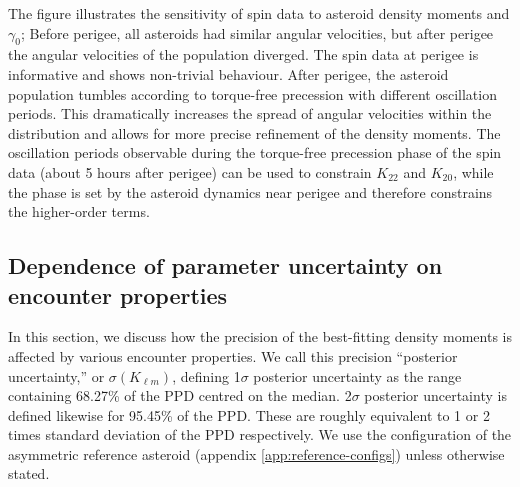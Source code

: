 \documentclass[fleqn,usenatbib]{mnras}
\begin{document}
The figure illustrates the sensitivity of spin data to asteroid density moments and $\gamma_0$; Before perigee, all asteroids had similar angular velocities, but after perigee the angular velocities of the population diverged. The spin data at perigee is informative and shows non-trivial behaviour. After perigee, the asteroid population tumbles according to torque-free precession with different oscillation periods. This dramatically increases the spread of angular velocities within the distribution and allows for more precise refinement of the density moments. The oscillation periods observable during the torque-free precession phase of the spin data (about 5 hours after perigee) can be used to constrain $K_{22}$ and $K_{20}$, while the phase is set by the asteroid dynamics near perigee and therefore constrains the higher-order terms.






\subsection{Dependence of parameter uncertainty on encounter properties}
\label{sec:fit-uncertainty}

In this section, we discuss how the precision of the best-fitting density moments is affected by various encounter properties. We call this precision ``posterior uncertainty,'' or $\sigma(K_{\ell m})$, defining 1$\sigma$  posterior uncertainty as the range containing 68.27\% of the PPD centred on the median. 2$\sigma$ posterior uncertainty is defined likewise for 95.45\% of the PPD. These are roughly equivalent to 1 or 2 times standard deviation of the PPD respectively. We use the configuration of the asymmetric reference asteroid (appendix \ref{app:reference-configs}) unless otherwise stated.
\end{document}
